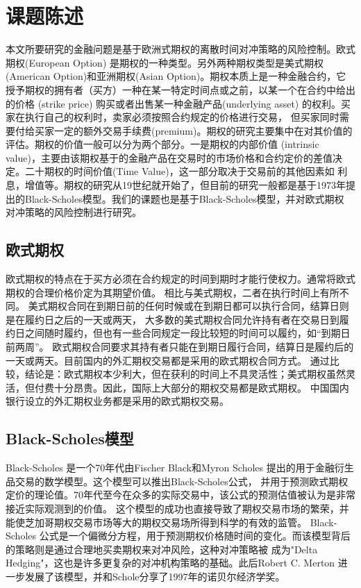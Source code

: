 \chapter{课题陈述}
\label{chp:2}

本文所要研究的金融问题是基于欧洲式期权的离散时间对冲策略的风险控制。欧式期权(European Option) 是期权的一种类型。另外两种期权类型是美式期权
(American Option)和亚洲期权(Asian Option)。期权本质上是一种金融合约，它授予期权的拥有者（买方）一种在某一特定时间点或之前，以某一个在合约中给出的价格
(strike price) 购买或者出售某一种金融产品(underlying asset) 的权利。买家在执行自己的权利时，卖家必须按照合约规定的价格进行交易，
但买家同时需要付给买家一定的额外交易手续费(premium)。期权的研究主要集中在对其价值的评估。期权的价值一般可以分为两个部分。一是期权的内部价值
(intrinsic value)，主要由该期权基于的金融产品在交易时的市场价格和合约定价的差值决定。二十期权的时间价值(Time Value)，这一部分取决于交易前的其他因素如
利息，增值等。期权的研究从19世纪就开始了，但目前的研究一般都是基于1973年提出的Black-Scholes模型。我们的课题也是基于Black-Scholes模型，并对欧式期权
对冲策略的风险控制进行研究。

\section{欧式期权} %
\label{sec:euroOption}

欧式期权的特点在于买方必须在合约规定的时间到期时才能行使权力。通常将欧式期权的合理价格价定为其期望价值。
相比与美式期权，二者在执行时间上有所不同。
美式期权合同在到期日前的任何时候或在到期日都可以执行合同，结算日则是在履约日之后的一天或两天，
大多数的美式期权合同允许持有者在交易日到履约日之间随时履约，但也有一些合同规定一段比较短的时间可以履约，如“到期日前两周”。
欧式期权合同要求其持有者只能在到期日履行合同，结算日是履约后的一天或两天。目前国内的外汇期权交易都是采用的欧式期权合同方式。
通过比较，结论是：欧式期权本少利大，但在获利的时间上不具灵活性；美式期权虽然灵活，但付费十分昂贵。因此，国际上大部分的期权交易都是欧式期权。
中国国内银行设立的外汇期权业务都是采用的欧式期权交易。


\section{Black-Scholes模型} %
\label{sec:BlackScholes}

Black-Scholes 是一个70年代由Fischer Black和Myron Scholes 提出的用于金融衍生品交易的数学模型。这个模型可以推出Black-Scholes公式，
并用于预测欧式期权定价的理论值。70年代至今在众多的实际交易中，该公式的预测估值被认为是非常接近实际观测到的价值。
这个模型的成功也直接导致了期权交易市场的繁荣，并能使芝加哥期权交易市场等大的期权交易场所得到科学的有效的监管。
Black-Scholes 公式是一个偏微分方程，用于预测期权价格随时间的变化。而该模型背后的策略则是通过合理地买卖期权来对冲风险，这种对冲策略被
成为"Delta Hedging"，这也是许多更复杂的对冲机构策略的基础。此后Robert C. Merton 进一步发展了该模型，并和Schole分享了1997年的诺贝尔经济学奖。


